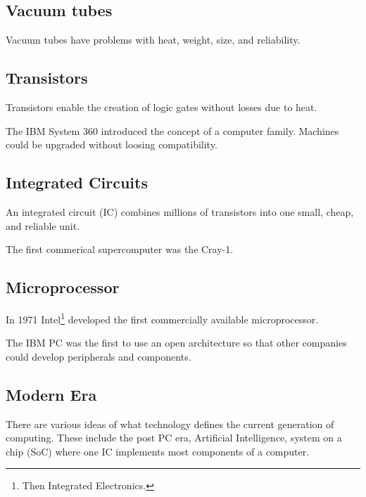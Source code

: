 \subsection{Vacuum tubes}
Vacuum tubes have problems with heat, weight, size, and reliability.

\subsection{Transistors}
Transistors enable the creation of logic gates without losses due to heat.

The IBM System 360 introduced the concept of a computer family. Machines could be upgraded without loosing compatibility.

\subsection{Integrated Circuits}
An integrated circuit (IC) combines millions of transistors into one small, cheap, and reliable unit.

The first commerical supercomputer was the Cray-1.

\subsection{Microprocessor}
In 1971 Intel\footnote{Then Integrated Electronics.} developed the first commercially available microprocessor.

The IBM PC was the first to use an open architecture so that other companies could develop peripherals and components.

\subsection{Modern Era}
There are various ideas of what technology defines the current generation of computing. These include the post PC era, Artificial Intelligence, system on a chip (SoC) where one IC implements most components of a computer.
